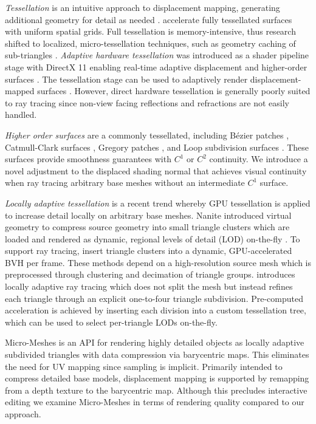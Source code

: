 \textit{Tessellation} is an intuitive approach to displacement mapping, generating additional geometry for detail as needed  \cite{Cook1984}. \cite{Snyder1987} accelerate fully tessellated surfaces with uniform spatial grids. Full tessellation is memory-intensive, thus research shifted to localized, micro-tessellation techniques, such as geometry caching of sub-triangles \cite{Pharr1996}. \textit{Adaptive hardware tessellation} was introduced as a shader pipeline stage with DirectX 11 \cite{Mic2009}  enabling real-time adaptive displacement and higher-order surfaces \cite{Niessner2016}.  The tessellation stage can be used to adaptively render displacement-mapped surfaces \cite{JangHan2012}\cite{JangHan2013}. However, direct hardware tessellation is generally poorly suited to ray tracing since non-view facing reflections and refractions are not easily handled.

\textit{Higher order surfaces} are a commonly tessellated, including Bézier patches  \cite{Munkberg2010}\cite{Concheiro2011}\cite{Tejima2015}, Catmull-Clark surfaces \cite{Niessner2013}, Gregory patches \cite{Loop2009}, and Loop subdivision surfaces \cite{StamLoop2003}\cite{Lee2000}\cite{Amresh2012}. These surfaces provide smoothness guarantees with $C^1$ or $C^2$ continuity. We introduce a novel adjustment to the displaced shading normal that achieves visual continuity when ray tracing arbitrary base meshes without an intermediate $C^1$ surface.

\textit{Locally adaptive tessellation} is a recent trend whereby GPU tessellation is applied to increase detail locally on arbitrary base meshes. Nanite introduced virtual geometry to compress source geometry into small triangle clusters which are loaded and rendered as dynamic, regional levels of detail (LOD) on-the-fly \cite{Karis2021}. To support ray tracing, \cite{Benthin2023} insert triangle clusters into a dynamic, GPU-accelerated BVH per frame. These methods depend on a high-resolution source mesh which is preprocessed through clustering and decimation of triangle groups.  \cite{Haydel2023} introduces locally adaptive ray tracing which does not split the mesh but instead refines each triangle through an explicit one-to-four triangle subdivision. Pre-computed acceleration is achieved by inserting each division into a custom tessellation tree, which can be used to select per-triangle LODs on-the-fly.

Micro-Meshes \cite{Nvidia2023} is an API for rendering highly detailed objects as locally adaptive subdivided triangles with data compression via barycentric maps. This eliminates the need for UV mapping since sampling is implicit. Primarily  intended to compress detailed base models, displacement mapping is supported by remapping from a depth texture to the barycentric map. Although this precludes interactive editing we examine Micro-Meshes in terms of rendering quality compared to our approach. 

